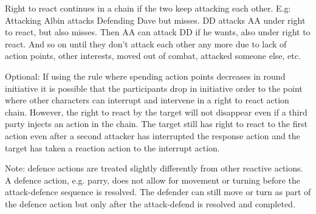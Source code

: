 Right to react continues in a chain if the two keep attacking each other.
E.g: Attacking Albin attacks Defending Dave but misses. DD attacks AA under right to react, but also misses. Then AA can attack DD if he wants, also under right to react. And so on until they don't attack each other any more due to lack of action points, other interests, moved out of combat, attacked someone else, etc.

Optional: If using the rule where spending action points decreases in round initiative it is possible that the participants drop in initiative order to the point where other characters can interrupt and intervene in a right to react action chain. However, the right to react by the target will not disappear even if a third party injects an action in the chain. The target still has right to react to the first action even after a second attacker has interrupted the response action and the target has taken a reaction action to the interrupt action.

Note: defence actions are treated slightly differently from other reactive actions. A defence action, e.g. parry, does not allow for movement or turning before the attack-defence sequence is resolved. The defender can still move or turn as part of the defence action but only after the attack-defend is resolved and completed. 



